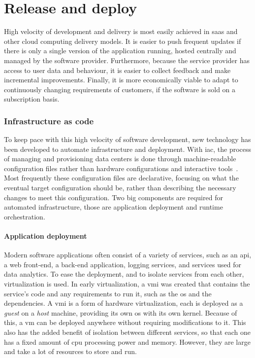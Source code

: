 \section{Release and deploy}

High velocity of development and delivery is most easily achieved in \gls{saas} and other cloud computing delivery models.
It is easier to push frequent updates if there is only a single version of the application running, hosted centrally and managed by the software provider.
Furthermore, because the service provider has access to user data and behaviour, it is easier to collect feedback and make incremental improvements.
Finally, it is more economically viable to adapt to continuously changing requirements of customers, if the software is sold on a subscription basis.

\subsubsection{Infrastructure as code}
To keep pace with this high velocity of software development, new technology has been developed to automate infrastructure and deployment.
With \gls{iac}, the process of managing and provisioning data centers is done through machine-readable configuration files rather than hardware configurations and interactive tools~\cite{wittig2018amazon}.
Most frequently these configuration files are declarative, focusing on what the eventual target configuration should be, rather than describing the necessary changes to meet this configuration.
Two big components are required for automated infrastructure, those are application deployment and runtime orchestration.

\paragraph{Application deployment}
Modern software applications often consist of a variety of services, such as an \gls{api}, a web front-end, a back-end application, logging services, and services used for data analytics.
To ease the deployment, and to isolate services from each other, virtualization is used.
In early virtualization, a \gls{vmi} was created that contains the service's code and any requirements to run it, such as the \gls{os} and the dependencies.
A \gls{vmi} is a form of hardware virtualization, each is deployed as a \textit{guest} on a \textit{host} machine, providing its own \gls{os} with its own kernel.
Because of this, a \gls{vm} can be deployed anywhere without requiring modifications to it.
This also has the added benefit of isolation between different services, so that each one has a fixed amount of \gls{cpu} processing power and memory.
However, they are large and take a lot of resources to store and run.

